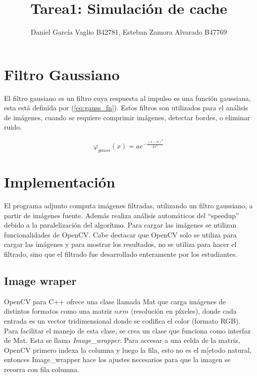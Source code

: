 \documentclass {article}
\begin{document}
\title{Tarea1: Simulación de cache}
\author{Daniel García Vaglio B42781, Esteban Zamora Alvarado B47769}

\maketitle


\section{Filtro Gaussiano}

El filtro gausiano es un filtro cuya respuesta al impulso es una función gaussiana, esta está
definida por (\ref{eq:gauss_fn}). Estos filtros son utilizados para el análisis de imágenes, cuando
se requiere comprimir imágenes, detectar bordes, o eliminar ruido. 

\begin{equation}
  \varphi_{gauss}(x)=ae^{-\frac{(x-n)^2}{2x^2}}
\label{eq:gauss_fn}
\end{equation}



\section{Implementación}

El programa adjunto computa imágenes filtradas, utilizando un filtro gaussiano, a partir de imágenes
fuente. Además realiza análisis automáticos del ``speedup'' debido a la paralelización del
algorítmo. Para cargar las imágenes se utilizan funcionalidades de OpenCV. Cabe destacar que OpenCV
solo se utiliza para cargar las imágenes y para mostrar los resultados, no se utiliza para hacer el
filtrado, sino que el filtrado fue desarrollado enteramente por los estudiantes.

\subsection{Image wraper}
OpenCV para C++ ofrece una clase llamada Mat que carga imágenes de distintos formatos como una
matriz $nxm$ (resolución en píxeles), donde cada entrada es un vector tridimensional donde se
codifica el color (formato RGB). Para facilitar el manejo de esta clase, se crea un clase que
funciona como interfaz de Mat. Esta se llama \textit{Image\_wrapper}. Para accesar a una celda de la
matriz, OpenCV primero indexa la columna y luego la fila, esto no es el m[etodo natural, entonces
Image\_wrapper hace los ajustes necesarios para que la imagen se recorra con fila columna.
\end{document}
